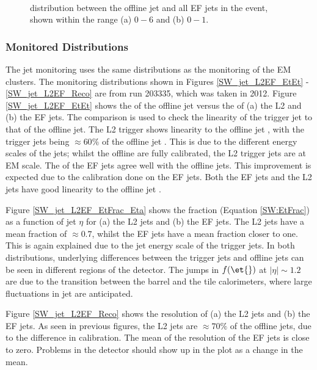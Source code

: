 \begin{figure}
\centering
\mbox{
                              }
\caption[\dr{} between offline and EF jets]{
\dr{} distribution between the offline jet and all EF jets in the event, shown within the range (a) $0 - 6$ and (b) $0 - 1$.
\label{SW_jet_EF_dR}}
\end{figure}



\subsubsection{Monitored Distributions}

The jet monitoring uses the same distributions as the monitoring of the EM clusters.
The monitoring distributions shown in Figures \ref{SW_jet_L2EF_EtEt} - \ref{SW_jet_L2EF_Reco} are from run 203335, which was taken in 2012.
Figure \ref{SW_jet_L2EF_EtEt} shows the \et{} of the offline jet versus the \et{} of (a) the L2 and (b) the EF jets.
The \et{} comparison is used to check the linearity of the trigger jet \et{} to that of the offline jet.
The L2 trigger \et{} shows linearity to the offline jet \et{}, with the trigger jets \et{} being $\approx 60 \%$ of the offline jet \et{}. 
This is due to the different energy scales of the jets; whilst the offline are fully calibrated, the L2 trigger jets are at EM scale.
The \et{} of the EF jets agree well with the offline jets. 
This improvement is expected due to the calibration done on the EF jets.
Both the EF jets and the L2 jets have good linearity to the offline jet \et{}.

Figure \ref{SW_jet_L2EF_EtFrac_Eta} shows the \et{} fraction (Equation \ref{SW:EtFrac}) as a function of jet $\eta$ for (a) the L2 jets and (b) the EF jets.
The L2 jets have a mean \et{} fraction of $\approx 0.7$, whilst the EF jets have a mean \et{} fraction closer to one.  
This is again explained due to the jet energy scale of the trigger jets.
In both distributions, underlying differences between the trigger jets and offline jets can be seen in different regions of the detector.
The jumps in $f(\et{})$ at $|\eta|\sim1.2$ are due to the transition between the barrel and the tile calorimeters, where large fluctuations in jet \pt{} are anticipated.


Figure \ref{SW_jet_L2EF_Reco} shows the \et{} resolution of (a) the L2 jets and (b) the EF jets. 
As seen in previous figures, the L2 jets are $\approx 70 \%$ of the offline jets, due to the difference in calibration.
The mean of the \et{} resolution of the EF jets is close to zero. 
Problems in the detector should show up in the plot as a change in the mean.



